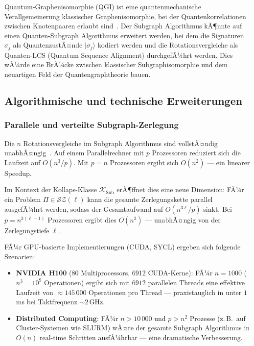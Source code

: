﻿\documentclass[a4paper,12pt]{article}
\theoremstyle{definition}
\begin{document}
Quantum-Graphenisomorphie (QGI) ist eine quantenmechanische Verallgemeinerung
klassischer Graphenisomorphie, bei der Quantenkorrelationen zwischen Knotenpaaren
erlaubt sind~\cite{mancinska2019quantum}.
Der Subgraph Algorithmus kÃ¶nnte auf einen Quanten-Subgraph Algorithmus erweitert werden,
bei dem die Signaturen $\sigma_j$ als QuantenzustÃ¤nde $|\sigma_j\rangle$ kodiert werden
und die Rotationsvergleiche als Quanten-LCS (Quantum Sequence Alignment) durchgefÃ¼hrt werden.
Dies wÃ¼rde eine BrÃ¼cke zwischen klassischer Subgraphisomorphie und dem neuartigen Feld
der Quantengraphtheorie bauen.

\subsection{Algorithmische und technische Erweiterungen}

\subsubsection{Parallele und verteilte Subgraph-Zerlegung}

Die $n$ Rotationsvergleiche im Subgraph Algorithmus sind vollstÃ¤ndig unabhÃ¤ngig~\cite{epp2026subgraph}.
Auf einem Parallelrechner mit $p$ Prozessoren reduziert sich die Laufzeit auf $O(n^3 / p)$.
Mit $p = n$ Prozessoren ergibt sich $O(n^2)$ --- ein linearer Speedup.

Im Kontext der Kollaps-Klasse $\mathcal{K}_\mathrm{Sub}$ erÃ¶ffnet dies eine neue Dimension:
FÃ¼r ein Problem $\Pi \in \mathcal{SZ}(\ell)$ kann die gesamte Zerlegungskette parallel
ausgefÃ¼hrt werden, sodass der Gesamtaufwand auf $O(n^{3\ell}/p)$ sinkt.
Bei $p = n^{3(\ell-1)}$ Prozessoren ergibt dies $O(n^3)$ --- unabhÃ¤ngig von der
Zerlegungstiefe $\ell$.

FÃ¼r GPU-basierte Implementierungen (CUDA, SYCL) ergeben sich folgende Szenarien:
\begin{itemize}
  \item \textbf{NVIDIA H100} (80 Multiprocessors, 6912 CUDA-Kerne): FÃ¼r $n = 1000$
        ($n^3 = 10^9$ Operationen) ergibt sich mit $6912$ parallelen Threads
        eine effektive Laufzeit von $\approx 145\,000$ Operationen pro Thread ---
        praxistauglich in unter $1$\,ms bei Taktfrequenz $\sim 2$\,GHz.
  \item \textbf{Distributed Computing}: FÃ¼r $n > 10\,000$ und $p > n^2$ Prozesse
        (z.\,B.\ auf Cluster-Systemen wie SLURM) wÃ¤re der gesamte Subgraph Algorithmus
        in $O(n)$ real-time Schritten ausfÃ¼hrbar --- eine dramatische Verbesserung.
\end{itemize}
\end{document}
